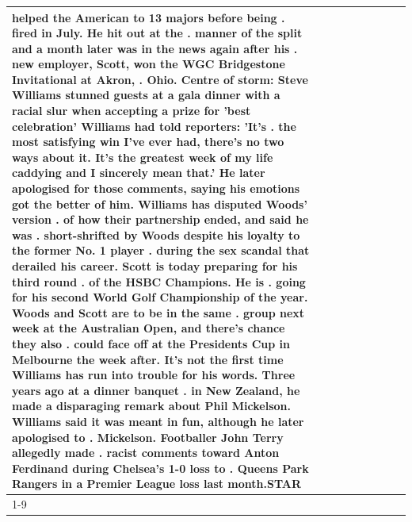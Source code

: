 \begin{table}[H]
\begin{tabular}{lllrlllll}
helped the American to 13 majors before being . fired in July. He hit out at the . manner of the split and a month later was in the news again after his . new employer, Scott, won the WGC Bridgestone Invitational at Akron, . Ohio. Centre of storm: Steve Williams stunned guests at a gala dinner with a racial slur when accepting a prize for 'best celebration' Williams had told reporters: 'It's . the most satisfying win I've ever had, there's no two ways about it. It's the greatest week of my life caddying and I sincerely mean that.' He later apologised for those comments, saying his emotions got the better of him. Williams has disputed Woods' version . of how their partnership ended, and said he was . short-shrifted by Woods despite his loyalty to the former No. 1 player . during the sex scandal that derailed his career. Scott is today preparing for his third round . of the HSBC Champions. He is . going for his second World Golf Championship of the year. Woods and Scott are to be in the same . group next week at the Australian Open, and there's chance they also . could face off at the Presidents Cup in Melbourne the week after. It's not the first time Williams has run into trouble for his words. Three years ago at a dinner banquet . in New Zealand, he made a disparaging remark about Phil Mickelson. Williams said it was meant in fun, although he later apologised to . Mickelson. Footballer John Terry allegedly made . racist comments toward Anton Ferdinand during Chelsea's 1-0 loss to . Queens Park Rangers in a Premier League loss last month.STAR \\
\cline{1-9}

\end{tabular}
\end{table}
